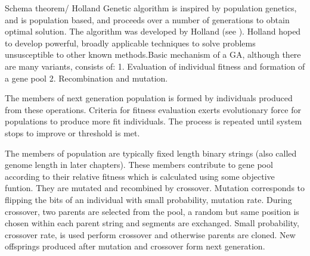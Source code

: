 
Schema theorem/ Holland
Genetic algorithm is inspired by population genetics, and is population based, and proceeds over a number of generations to obtain optimal solution. The algorithm was developed by Holland (see \cite{Holland1975}). Holland hoped to develop powerful, broadly applicable techniques to solve problems unsusceptible to other known methods.Basic mechanism of a GA, although there are many variants, consists of:
1. Evaluation of individual fitness and formation of a gene pool
2. Recombination and mutation.

The members of next generation population is formed by individuals produced from these operations. Criteria for fitness evaluation exerts evolutionary force for populations to produce more fit individuals. The process is repeated until system stops to improve or threshold is met.

The members of population are typically fixed length binary strings (also called genome length in later chapters). These members contribute to gene pool according to their relative fitness which is calculated using some objective funtion. They are mutated and recombined by crossover. Mutation corresponds to flipping the bits of an individual with small probability, mutation rate. During crossover, two parents are selected from the pool, a random but same position is chosen within each parent string and segments are exchanged. Small probability, crossover rate, is used perform crossover and otherwise parents are cloned. New offsprings produced after mutation and crossover form next generation.





